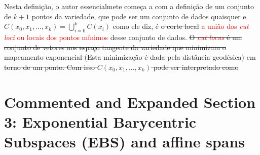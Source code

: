 \documentclass[a4paper,titlepage]{article}
\newcommand{\juliana}[1]{\textcolor{red}{#1}}
\begin{document}
Nesta definição, o autor essencialmete começa a com a definição de um conjunto de $k+1$ pontos da variedade, que pode ser um conjunto de dados quaisquer e $C(x_0,x_1,...,x_k) =\bigcup_{i=0}^{k} C(x_i)$ como ele diz, é \sout{o corte local} \juliana{a união dos \textit{cut loci} ou locais dos pontos mínimos} desse conjunto de dados.
\sout{O \juliana{\textit{cut locus}} é um conjunto de vetores nos espaço tangente da variedade que minimizam o mapeamento exponencial (Esta minimização é dada pela distância geodésica) em torno de um ponto. Com isso $C(x_0,x_1,...,x_k)$ pode ser interpretado como}

\vspace{1em}
\vspace{1em}

\begin{center}
\end{center}


\section{Commented and Expanded Section 3: Exponential Barycentric Subspaces
(EBS) and affine spans}
{
\vspace{1em}
\vspace{1em}
}
\end{document}
